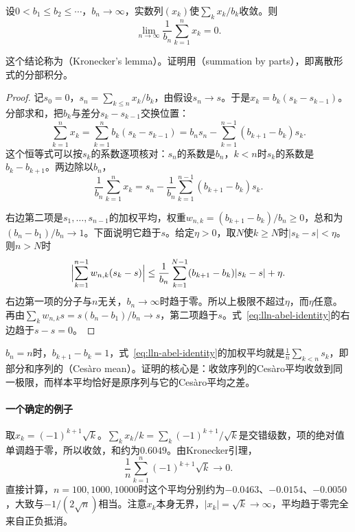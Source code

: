 \begin{lemma}[Kronecker引理]
\label{lem:lln-kronecker}
设$0<b_1\leq b_2\leq\cdots$，$b_n\to\infty$，实数列$(x_k)$使$\sum_kx_k/b_k$收敛。则
\begin{equation}
 \lim_{n\to\infty}\frac{1}{b_n}\sum_{k=1}^{n}x_k=0 .
 \label{eq:lln-kronecker}
\end{equation}
\end{lemma}

这个结论称为（Kronecker's lemma）。证明用（summation by parts），即离散形式的分部积分。

\begin{proof}
记$s_0=0$，$s_n=\sum_{k\leq n}x_k/b_k$，由假设$s_n\to s$。于是$x_k=b_k(s_k-s_{k-1})$。分部求和，把$b_k$与差分$s_k-s_{k-1}$交换位置：
\[
 \sum_{k=1}^{n}x_k=\sum_{k=1}^{n}b_k(s_k-s_{k-1})=b_ns_n-\sum_{k=1}^{n-1}(b_{k+1}-b_k)s_k .
\]
这个恒等式可以按$s_k$的系数逐项核对：$s_n$的系数是$b_n$，$k<n$时$s_k$的系数是$b_k-b_{k+1}$。两边除以$b_n$，
\begin{equation}
 \frac{1}{b_n}\sum_{k=1}^{n}x_k=s_n-\frac{1}{b_n}\sum_{k=1}^{n-1}(b_{k+1}-b_k)s_k .
 \label{eq:lln-abel-identity}
\end{equation}

右边第二项是$s_1,\dots,s_{n-1}$的加权平均，权重$w_{n,k}=(b_{k+1}-b_k)/b_n\geq0$，总和为$(b_n-b_1)/b_n\to1$。下面说明它趋于$s$。给定$\eta>0$，取$N$使$k\geq N$时$\lvert s_k-s\rvert<\eta$。则$n>N$时
\[
 \Bigl\lvert\sum_{k=1}^{n-1}w_{n,k}(s_k-s)\Bigr\rvert\leq\frac{1}{b_n}\sum_{k=1}^{N-1}(b_{k+1}-b_k)\lvert s_k-s\rvert+\eta .
\]
右边第一项的分子与$n$无关，$b_n\to\infty$时趋于零。所以上极限不超过$\eta$，而$\eta$任意。再由$\sum_kw_{n,k}s=s(b_n-b_1)/b_n\to s$，第二项趋于$s$。式~\eqref{eq:lln-abel-identity}的右边趋于$s-s=0$。
\end{proof}

$b_n=n$时，$b_{k+1}-b_k=1$，式~\eqref{eq:lln-abel-identity}的加权平均就是$\frac1n\sum_{k<n}s_k$，即部分和序列的（Cesàro mean）。证明的核心是：收敛序列的Cesàro平均收敛到同一极限，而样本平均恰好是原序列与它的Cesàro平均之差。

\paragraph{一个确定的例子}
取$x_k=(-1)^{k+1}\sqrt{k}$。$\sum_kx_k/k=\sum_k(-1)^{k+1}/\sqrt{k}$是交错级数，项的绝对值单调趋于零，所以收敛，和约为$0.6049$。由Kronecker引理，
\[
 \frac1n\sum_{k=1}^{n}(-1)^{k+1}\sqrt{k}\to0 .
\]
直接计算，$n=100,1000,10000$时这个平均分别约为$-0.0463$、$-0.0154$、$-0.0050$，大致与$-1/(2\sqrt{n})$相当。注意$x_k$本身无界，$\lvert x_k\rvert=\sqrt{k}\to\infty$，平均趋于零完全来自正负抵消。

